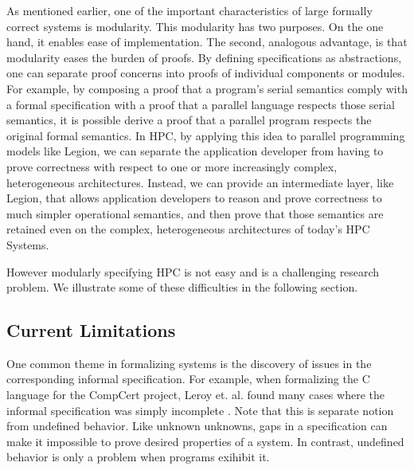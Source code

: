 \documentclass[sigconf]{acmart}
\begin{document}
As mentioned earlier, one of the important characteristics of large formally
correct systems is modularity. This modularity has two purposes. On the one
hand, it enables ease of implementation. The second, analogous advantage, is
that modularity eases the burden of proofs. By defining
specifications as abstractions, one can separate proof concerns into proofs of
individual components or modules. For example, by composing a proof that a
program's serial semantics comply with a formal specification with a proof that
a parallel language respects those serial semantics, it is possible derive a
proof that a parallel program respects the original formal semantics. In HPC,
by applying this idea to parallel programming models like Legion, we can
separate the application developer from having to prove correctness with
respect to one or more increasingly complex, heterogeneous architectures.
Instead, we can provide an intermediate layer, like Legion, that allows
application developers to reason and prove correctness to much simpler
operational semantics, and then prove that those semantics are retained even on
the complex, heterogeneous architectures of today's HPC Systems.

However modularly specifying HPC is not easy and is a challenging research
problem. We illustrate some of these difficulties in the following section.

\subsection{Current Limitations}

One common theme in formalizing systems is the discovery of issues in the
corresponding informal specification. For example, when formalizing the C
language for the CompCert project, Leroy et. al. found many cases where the
informal specification was simply incomplete \cite{leroy2012compcert}. Note
that this is separate notion from undefined behavior. Like unknown unknowns,
gaps in a specification can make it impossible to prove desired properties of a
system.  In contrast, undefined behavior is only a problem when programs
exihibit it.
\end{document}
